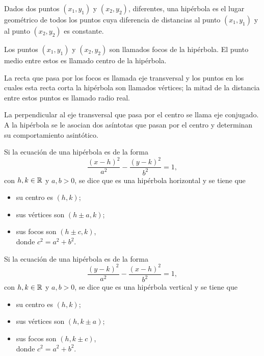 \documentclass[a4,11pt]{aleph-notas}
\begin{document}
\begin{defi}[Hipérbola]
    Dados dos puntos $(x_1,y_1)$ y $(x_2,y_2)$, diferentes, una hipérbola es el lugar geométrico de todos los puntos cuya diferencia de distancias al punto $(x_1,y_1)$ y al punto $(x_2,y_2)$ es constante.

    Los puntos $(x_1,y_1)$ y $(x_2,y_2)$ son llamados focos de la hipérbola. El punto medio entre estos es llamado centro de la hipérbola.

    La recta que pasa por los focos es llamada eje transversal y los puntos en los cuales esta recta corta la hipérbola son llamados vértices; la mitad de la distancia entre estos puntos es llamado radio real.

    La perpendicular al eje transversal que pasa por el centro se llama eje conjugado. A la hipérbola se le asocian dos asíntotas que pasan por el centro y determinan su comportamiento asintótico.
\end{defi}

\begin{teo}
    Si la ecuación de una hipérbola es de la forma 
    \[
        \dfrac{(x-h)^2}{a^2}-\dfrac{(y-k)^2}{b^2}=1,
    \]
    con $h,k\in\mathbb{R}$ y $a,b>0$, se dice que es una hipérbola horizontal y se tiene que
    \vspace*{3mm}
    \begin{multicols}{2}
    \begin{itemize}
        \item su centro es $(h,k)$;
        \item sus vértices son $(h\pm a,k)$;
        \item sus focos son $(h\pm c,k)$,\\ donde $c^2 = a^2 + b^2$.
    \end{itemize}
    \end{multicols}
\end{teo}

\begin{teo}
    Si la ecuación de una hipérbola es de la forma 
    \[
        \dfrac{(y-k)^2}{a^2}-\dfrac{(x-h)^2}{b^2}=1,
    \]
    con $h,k\in\mathbb{R}$ y $a,b>0$, se dice que es una hipérbola vertical y se tiene que
    \vspace*{3mm}
    \begin{multicols}{2}
    \begin{itemize}
        \item su centro es $(h,k)$;
        \item sus vértices son $(h,k\pm a)$;
        \item sus focos son $(h,k\pm c)$,\\ donde $c^2 = a^2 + b^2$.
    \end{itemize}
    \end{multicols}
\end{teo}
\end{document}
